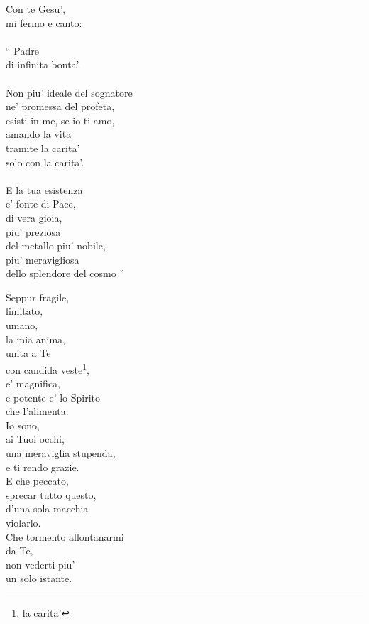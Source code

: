 \begin{haiku}
Con te Gesu',\\
mi fermo e canto:\\
\leavevmode\\
\hspace{5mm} \enquote{
Padre\\
di infinita bonta'.\\
\leavevmode\\
Non piu' ideale del sognatore\\
ne' promessa del profeta,\\
esisti in me, se io ti amo,\\
amando la vita\\
tramite la carita'\\
solo con la carita'.\\
\leavevmode\\
E la tua esistenza\\
e' fonte di Pace,\\
di vera gioia,\\
piu' preziosa\\
del metallo piu' nobile,\\
piu' meravigliosa\\
dello splendore del cosmo
    }\\
\end{haiku}



\begin{haiku}
    Seppur fragile,\\
    limitato,\\
    umano,\\
    la mia anima,\\
    unita a Te\\
    con candida veste\footnote{la carita'},\\
    e' magnifica,\\
    e potente e' lo Spirito\\
    che l'alimenta.\\
    Io sono, \\
    ai Tuoi occhi,\\
    una meraviglia stupenda,\\
    e ti rendo grazie.\\
    E che peccato,\\
    sprecar tutto questo,\\
    d'una sola macchia\\
    violarlo.\\
    Che tormento allontanarmi\\
    da Te,\\
    non vederti piu' \\
    un solo istante.\\
\end{haiku}

